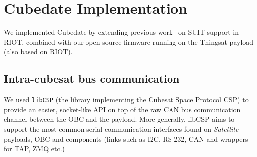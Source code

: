 \section{Cubedate Implementation}
\label{sec:implementation}

\iffalse
SUIT is used in Cubedate payloads as a \textit{Data Delivery Mechanism} bundling
the security properties described in section IV D. The implementation described
next seeks to remain generic to be re-usable in different scenarios while tailored
for the Satellite ThingSat use case.

SUIT state machine running on the deployed device does not need to care about
how this \textit{Data} is delivered or where it will be installed, it just
needs to be handed a \textit{manifest}.

\begin{itemize}
    \item \textbf{Data Resource URI}: a locally (e.g.: mounted USB  device) or remotely
    (HTTP or CoAP endpoint) accessible file.
    \item \textbf{Data Resource Delivery Mechanism}: transport mechanism to deliver SUIT:
    e.g. \{message model, network stack, network interface\}
    bundle, or FileSystem \textit{read/write} functions.
    \textit{manifest} and data resource to the SUIT state machine.
    \item \textbf{Data Resource Installation Storage}: internal or external Volatile or
    Non-volatile storage, e.g. RAM (mission files, FemtoContainers\cite{zandberg2021femto})
    or FileSystem or internal FLASH.
\end{itemize}

As the case where the Data Resource URI points to a locally available is simply a
simplified case, a networked scenario with a URL will be described.

\francisco{PLACE HOLDER FOR A DIAGRAM}
\fi

We implemented Cubedate by extending previous work~\cite{zandberg2019secure} on SUIT support in RIOT, combined with our open source firmware running on the Thingsat payload (also based on RIOT).

\subsection{Intra-cubesat bus communication}

We used \texttt{libCSP} (the library implementing the Cubesat Space Protocol CSP) to provide an easier, socket-like API on top of the raw CAN bus communication channel between the OBC and the payload. More generally, libCSP aims to support the most common serial communication interfaces found on \textit{Satellite} payloads, OBC and components (links such as I2C, RS-232, CAN and wrappers for TAP, ZMQ etc.) 




